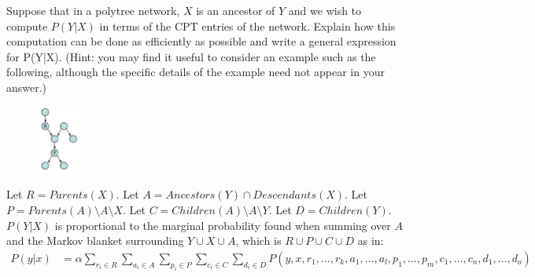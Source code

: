 \documentclass[12pt]{article}
\newenvironment{problem}[2][Problem]{\begin{trivlist}
\item[\hskip \labelsep {\bfseries #1}\hskip \labelsep {\bfseries #2.}]}{\end{trivlist}}
\begin{document}
\begin{problem}{4}
	Suppose that in a polytree network, $X$ is an ancestor of $Y$ and we wish to compute $P(Y|X)$
	in terms of the CPT entries of the network.
	Explain how this computation can be done as efficiently as possible and write a general expression for P(Y|X).
	(Hint: you may find it useful to consider an example such as the following,
	although the specific details of the example need not appear in your answer.) \\
	\begin{figure}[h]
		\centering
		\includegraphics[width=0.125\textwidth]{fig/q4.jpg}
		\label{fig:q4}
	\end{figure}

	Let $R=Parents(X)$.
	Let $A=Ancestors(Y) \cap Descendants(X)$.
	Let $P=Parents(A) \setminus A \setminus X$.
	Let $C=Children(A) \setminus A \setminus Y$.
	Let $D=Children(Y)$.
	$P(Y|X)$ is proportional to the marginal probability found when summing over $A$ and the
	Markov blanket surrounding $Y \cup X \cup A$, which is $R \cup P \cup C \cup D$ as in:
	\begin{align*}
		P(y|x)
		&=\alpha \sum_{r_i \in R}\sum_{a_i \in A}\sum_{p_i \in P}\sum_{c_i \in C}\sum_{d_i \in D}
		P(y,x,r_1,\dots,r_k,a_1,\dots,a_l,p_1,\dots,p_m,c_1,\dots,c_n,d_1,\dots,d_o)
	\end{align*}
\end{problem}
\end{document}
